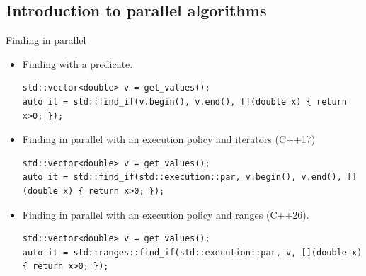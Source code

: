 \subsection{Introduction to parallel algorithms}

\begin{frame}[t,fragile]{Finding in parallel}
\begin{itemize}

\item Finding with a predicate.

\begin{lstlisting}
std::vector<double> v = get_values();
auto it = std::find_if(v.begin(), v.end(), [](double x) { return x>0; });
\end{lstlisting}

\item Finding in parallel with an execution policy and iterators (C++17)

\begin{lstlisting}
std::vector<double> v = get_values();
auto it = std::find_if(std::execution::par, v.begin(), v.end(), [](double x) { return x>0; });
\end{lstlisting}

\item Finding in parallel with an execution policy and ranges (C++26).
\begin{lstlisting}
std::vector<double> v = get_values();
auto it = std::ranges::find_if(std::execution::par, v, [](double x) { return x>0; });
\end{lstlisting}

\end{itemize}
\end{frame}


